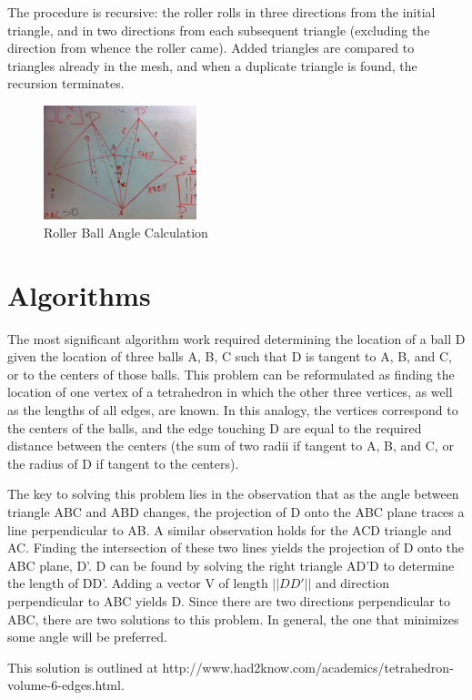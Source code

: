 \documentclass[letterpaper,10pt]{IEEEtran}
\begin{document}
The procedure is recursive: the roller rolls in three directions from the initial triangle, and in two directions from each subsequent triangle (excluding the direction from whence the roller came).
Added triangles are compared to triangles already in the mesh, and when a duplicate triangle is found, the recursion terminates.
\begin{figure}[!h]
\centering
\includegraphics[width=1.75in]{main/data/angle}
\caption{Roller Ball Angle Calculation}
\label{fig_angle}
\end{figure}

\section{Algorithms}
The most significant algorithm work required determining the location of a ball D given the location of three balls A, B, C such that D is tangent to A, B, and C, or to the centers of those balls.
This problem can be reformulated as finding the location of one vertex of a tetrahedron in which the other three vertices, as well as the lengths of all edges, are known.
In this analogy, the vertices correspond to the centers of the balls, and the edge touching D are equal to the required distance between the centers (the sum of two radii if tangent to A, B, and C, or the radius of D if tangent to the centers).

The key to solving this problem lies in the observation that as the angle between triangle ABC and ABD changes, the projection of D onto the ABC plane traces a line perpendicular to AB.
A similar observation holds for the ACD triangle and AC.
Finding the intersection of these two lines yields the projection of D onto the ABC plane, D'.
D can be found by solving the right triangle AD'D to determine the length of DD'.
Adding a vector V of length $||DD'||$ and direction perpendicular to ABC yields D.
Since there are two directions perpendicular to ABC, there are two solutions to this problem.
In general, the one that minimizes some angle will be preferred.

This solution is outlined at http://www.had2know.com/academics/tetrahedron-volume-6-edges.html.
\end{document}
